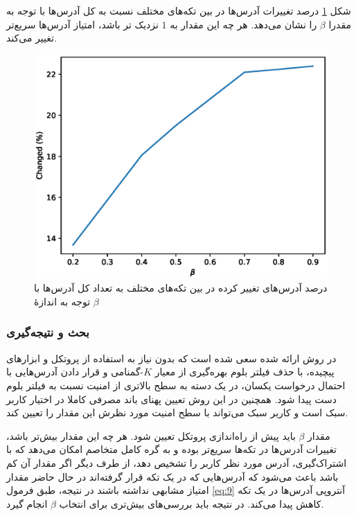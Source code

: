 شکل \ref{fig:betachange} درصد تغییرات آدرس‌ها در بین تکه‌های مختلف نسبت به کل آدرس‌ها با توجه به مقدرا $\beta$ را نشان می‌دهد. هر چه این مقدار به $1$ نزدیک  تر باشد، امتیاز آدرس‌ها سریع‌تر تغییر می‌کند.

\begin{figure}
	\centering
	\includegraphics[width=0.7\linewidth]{image/beta_change}
	\caption{درصد آدرس‌های تغییر کرده در بین تکه‌های مختلف به تعداد کل آدرس‌ها با توجه به اندازهٔ $\beta$}
	\label{fig:betachange}
\end{figure}



\subsubsection{بحث و نتیجه‌گیری}

در روش ارائه شده سعی شده است که بدون نیاز به استفاده از پروتکل و ابزار‌های پیچیده، با حذف فیلتر بلوم بهره‌گیری از معیار ‌$K$-گمنامی و قرار دادن آدرس‌هایی با احتمال درخواست یکسان، در یک دسته به سطح بالاتری از امنیت نسبت به فیلتر بلوم دست پیدا شود. همچنین در این روش تعیین پهنای باند مصرفی کاملا در اختیار کاربر سبک است و کاربر سبک می‌تواند با سطح امنیت مورد نظرش این مقدار را تعیین کند.

مقدار $\beta$ باید پیش از راه‌اندازی پروتکل تعیین شود. هر چه این مقدار بیش‌تر باشد، تغییرات آدرس‌ها در تکه‌ها سریع‌تر بوده و به گره کامل متخاصم امکان می‌دهد که با اشتراک‌گیری، آدرس مورد نظر کاربر را تشخیص دهد، از طرف دیگر اگر مقدار آن کم باشد باعث می‌شود که آدرس‌هایی که در یک تکه قرار گرفته‌اند در حال حاضر مقدار امتیاز مشابهی نداشته باشند در نتیجه، طبق فرمول \eqref{eq:9} آنتروپی آدرس‌ها در یک تکه کاهش پیدا می‌کند. در نتیجه باید بررسی‌های بیش‌تری برای انتخاب $\beta$ انجام گیرد.

